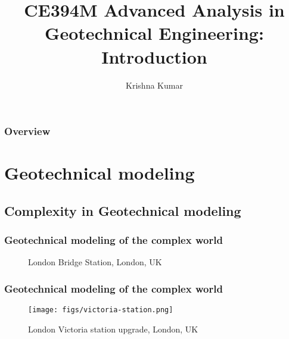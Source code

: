 \documentclass[handout]{beamer}
\title[CE394M: Intro to geotech analysis]{CE394M Advanced Analysis in Geotechnical Engineering: Introduction}
\author{Krishna Kumar} %
\institute[UT Austin] %
{
University of Texas at Austin \\
\medskip
\textit{
  \url{krishnak@utexas.edu}} %
}
\date{} %
\begin{document}
\begin{frame}
\titlepage %
\end{frame}

\begin{frame}
 \frametitle{Overview}
 \tableofcontents
\end{frame}


\section{Geotechnical modeling}

\subsection{Complexity in Geotechnical modeling}
\begin{frame}
\frametitle{Geotechnical modeling of the complex world}
\begin{figure}
	\caption*{London Bridge Station, London, UK}
\end{figure}
\end{frame}

\begin{frame}
\frametitle{Geotechnical modeling of the complex world}
\begin{figure}
	\texttt{[image: figs/victoria-station.png]}
	\caption{London Victoria station upgrade, London, UK}
\end{figure}
\end{frame}
\end{document}
